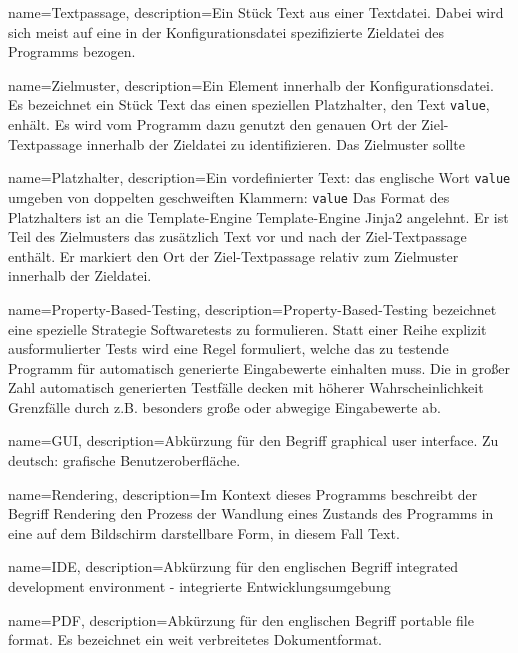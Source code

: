 \makeglossaries

{
    name=Textpassage,
    description={Ein Stück Text aus einer Textdatei. Dabei
            wird sich meist auf eine in der Konfigurationsdatei spezifizierte
            Zieldatei des Programms bezogen.}
}

{
    name=Zielmuster,
    description={Ein Element innerhalb der Konfigurationsdatei. Es bezeichnet ein
            Stück Text das einen speziellen \gls{Platzhalter}, den Text \texttt{{{value}}},
            enhält. Es wird vom Programm dazu genutzt den genauen Ort der Ziel-\gls{Textpassage}
            innerhalb der Zieldatei zu identifizieren. Das Zielmuster sollte}
}

{
    name=Platzhalter,
    description={Ein vordefinierter Text: das englische Wort \texttt{value}
            umgeben von doppelten geschweiften Klammern:
            \texttt{{{value}}} Das Format des Platzhalters ist an
            die Template-Engine Template-Engine Jinja2 \cite{jinja2} angelehnt.
            Er ist Teil des \gls{Zielmuster}s das zusätzlich Text vor und nach
            der Ziel-\gls{Textpassage} enthält. Er markiert den Ort der Ziel-\gls{Textpassage}
            relativ zum \gls{Zielmuster} innerhalb der Zieldatei.}
}

{
    name=Property-Based-Testing,
    description={Property-Based-Testing bezeichnet eine spezielle Strategie Softwaretests
            zu formulieren. Statt einer Reihe explizit ausformulierter Tests wird eine Regel
            formuliert, welche das zu testende Programm für automatisch generierte Eingabewerte
            einhalten muss. Die in großer Zahl automatisch generierten Testfälle
            decken mit höherer Wahrscheinlichkeit Grenzfälle durch z.B. besonders
            große oder abwegige Eingabewerte ab.}
}

{
    name=GUI,
    description={Abkürzung für den Begriff graphical user interface. Zu deutsch:
            grafische Benutzeroberfläche.}
}

{
    name=Rendering,
    description={Im Kontext dieses Programms beschreibt der Begriff Rendering den
            Prozess der Wandlung eines Zustands des Programms in eine auf dem Bildschirm
            darstellbare Form, in diesem Fall Text.}
}

{
    name=IDE,
    description={Abkürzung für den englischen Begriff integrated development
            environment - integrierte Entwicklungsumgebung}
}

{
    name=PDF,
    description={Abkürzung für den englischen Begriff portable file format. Es
            bezeichnet ein weit verbreitetes Dokumentformat.}
}

\glsaddall